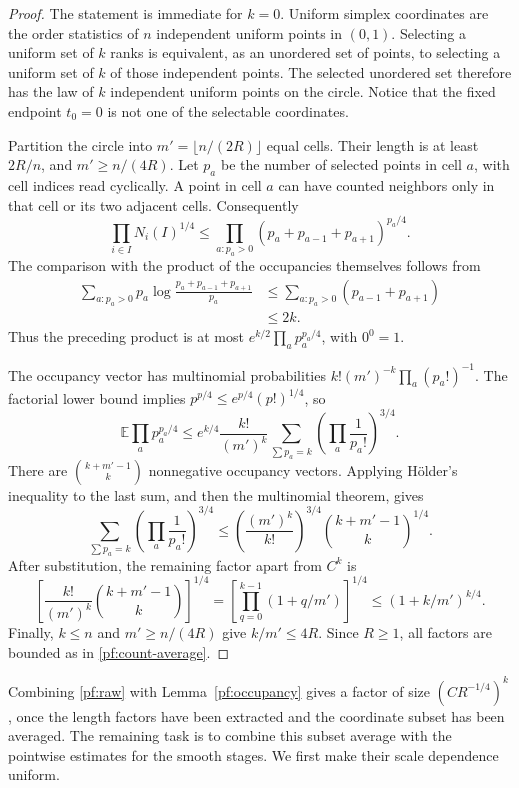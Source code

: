 \begin{proof}
The statement is immediate for $k=0$.  Uniform simplex coordinates
are the order statistics of $n$ independent uniform points in
$(0,1)$.  Selecting a uniform set of $k$ ranks is equivalent, as an
unordered set of points, to selecting a uniform set of $k$ of those
independent points.  The selected unordered set therefore has the
law of $k$ independent uniform points on the circle.  Notice that the
fixed endpoint $t_0=0$ is not one of the selectable coordinates.

Partition the circle into $m'=\lfloor n/(2R)\rfloor$ equal cells.
Their length is at least $2R/n$, and $m'\ge n/(4R)$.  Let $p_a$ be
the number of selected points in cell $a$, with cell indices read
cyclically.  A point in cell $a$ can have counted neighbors only in
that cell or its two adjacent cells.  Consequently
\[
 \prod_{i\in I}N_i(I)^{1/4}
 \le\prod_{a:p_a>0}(p_a+p_{a-1}+p_{a+1})^{p_a/4}.
\]
The comparison with the product of the occupancies themselves follows
from
\[
 \begin{split}
 \sum_{a:p_a>0}p_a
  \log\frac{p_a+p_{a-1}+p_{a+1}}{p_a}
 &\le\sum_{a:p_a>0}(p_{a-1}+p_{a+1})\\
 &\le2k.
 \end{split}
\]
Thus the preceding product is at most
$e^{k/2}\prod_a p_a^{p_a/4}$, with $0^0=1$.

The occupancy vector has multinomial probabilities
$k!(m')^{-k}\prod_a(p_a!)^{-1}$.  The factorial lower bound implies
$p^{p/4}\le e^{p/4}(p!)^{1/4}$, so
\[
 \mathbb E\prod_a p_a^{p_a/4}
 \le e^{k/4}\frac{k!}{(m')^k}
    \sum_{\sum p_a=k}\left(\prod_a\frac1{p_a!}\right)^{3/4}.
\]
There are $\binom{k+m'-1}{k}$ nonnegative occupancy vectors.  Applying
H\"older's inequality to the last sum, and then the multinomial
theorem, gives
\[
 \sum_{\sum p_a=k}\left(\prod_a\frac1{p_a!}\right)^{3/4}
 \le
 \left(\frac{(m')^k}{k!}\right)^{3/4}
 \binom{k+m'-1}{k}^{1/4}.
\]
After substitution, the remaining factor apart from $C^k$ is
\[
 \left[\frac{k!}{(m')^k}\binom{k+m'-1}{k}\right]^{1/4}
 =\left[\prod_{q=0}^{k-1}(1+q/m')\right]^{1/4}
 \le(1+k/m')^{k/4}.
\]
Finally, $k\le n$ and $m'\ge n/(4R)$ give $k/m'\le4R$.
Since $R\ge1$, all factors are bounded as in
\eqref{pf:count-average}.
\end{proof}

Combining \eqref{pf:raw} with Lemma~\ref{pf:occupancy} gives a factor
of size $(CR^{-1/4})^k$, once the length factors have been extracted
and the coordinate subset has been averaged.  The remaining task is
to combine this subset average with the pointwise estimates for the
smooth stages.  We first make their scale dependence uniform.

